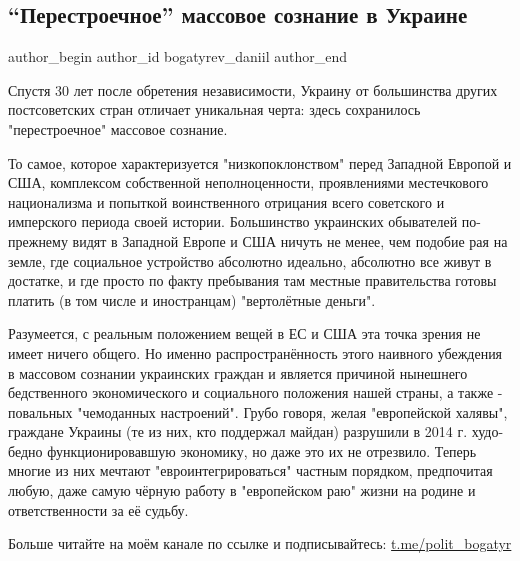  
 
 
 
 
 
\subsection{\enquote{Перестроечное} массовое сознание в Украине}
\label{sec:02_09_2021.fb.bogatyrev_daniil.1.nezalezhnist_soznanie_perestrojka}
 
\ifcmt
 author_begin
   author_id bogatyrev_daniil
 author_end
\fi

Спустя 30 лет после обретения независимости, Украину от большинства других
постсоветских стран отличает уникальная черта: здесь сохранилось
"перестроечное" массовое сознание. 

То самое, которое характеризуется "низкопоклонством" перед Западной Европой и
США, комплексом собственной неполноценности, проявлениями местечкового
национализма и попыткой воинственного отрицания всего советского и имперского
периода своей истории. Большинство украинских обывателей по-прежнему видят в
Западной Европе и США ничуть не менее, чем подобие рая на земле, где социальное
устройство абсолютно идеально, абсолютно все живут в достатке, и где просто по
факту пребывания там местные правительства готовы платить (в том числе и
иностранцам) "вертолётные деньги".

Разумеется, с реальным положением вещей в ЕС и США эта точка зрения не имеет
ничего общего. Но именно распространённость этого наивного убеждения в массовом
сознании украинских граждан и является причиной нынешнего бедственного
экономического и социального положения нашей страны, а также - повальных
"чемоданных настроений". Грубо говоря, желая "европейской халявы", граждане
Украины (те из них, кто поддержал майдан) разрушили в 2014 г. худо-бедно
функционировавшую экономику, но даже это их не отрезвило. Теперь многие из них
мечтают "евроинтегрироваться" частным порядком, предпочитая любую, даже самую
чёрную работу в "европейском раю" жизни на родине и ответственности за её
судьбу.

Больше читайте на моём канале по ссылке и подписывайтесь: \url{t.me/polit_bogatyr}
